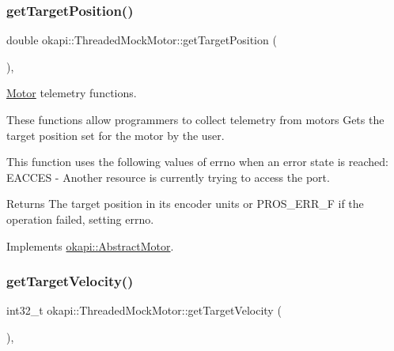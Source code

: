 \mbox{\label{classokapi_1_1ThreadedMockMotor_a6672ed05fca974c48f34bd279d6ab57b}} 
\subsubsection{\texorpdfstring{getTargetPosition()}{getTargetPosition()}}
{\footnotesize\ttfamily double okapi\+::\+Threaded\+Mock\+Motor\+::get\+Target\+Position (\begin{DoxyParamCaption}{ }\end{DoxyParamCaption})\hspace{0.3cm}{\ttfamily [override]}, {\ttfamily [virtual]}}



\mbox{\hyperlink{classokapi_1_1Motor}{Motor}} telemetry functions. 

These functions allow programmers to collect telemetry from motors Gets the target position set for the motor by the user.

This function uses the following values of errno when an error state is reached\+: E\+A\+C\+C\+ES -\/ Another resource is currently trying to access the port.

\begin{DoxyReturn}{Returns}
The target position in its encoder units or P\+R\+O\+S\+\_\+\+E\+R\+R\+\_\+F if the operation failed, setting errno. 
\end{DoxyReturn}


Implements \mbox{\hyperlink{classokapi_1_1AbstractMotor_a144377e461ec5801289c37bab5132cce}{okapi\+::\+Abstract\+Motor}}.

\mbox{\label{classokapi_1_1ThreadedMockMotor_a7be292b3f0626710a23048f268b79786}} 
\subsubsection{\texorpdfstring{getTargetVelocity()}{getTargetVelocity()}}
{\footnotesize\ttfamily int32\+\_\+t okapi\+::\+Threaded\+Mock\+Motor\+::get\+Target\+Velocity (\begin{DoxyParamCaption}{ }\end{DoxyParamCaption})\hspace{0.3cm}{\ttfamily [override]}, {\ttfamily [virtual]}}



